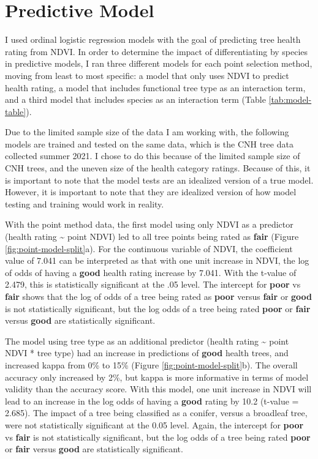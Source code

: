 \documentclass[12pt,twoside]{reedthesis}
\begin{document}
\hypertarget{predictive-model}{%
\section{Predictive Model}\label{predictive-model}}

I used ordinal logistic regression models with the goal of predicting
tree health rating from NDVI. In order to determine the impact of
differentiating by species in predictive models, I ran three different
models for each point selection method, moving from least to most
specific: a model that only uses NDVI to predict health rating, a model
that includes functional tree type as an interaction term, and a third
model that includes species as an interaction term (Table
\ref{tab:model-table}).

Due to the limited sample size of the data I am working with, the
following models are trained and tested on the same data, which is the
CNH tree data collected summer 2021. I chose to do this because of the
limited sample size of CNH trees, and the uneven size of the health
category ratings. Because of this, it is important to note that the
model tests are an idealized version of a true model. However, it is
important to note that they are idealized version of how model testing
and training would work in reality.

With the point method data, the first model using only NDVI as a
predictor (health rating \textasciitilde{} point NDVI) led to all tree points being
rated as \textbf{fair} (Figure \ref{fig:point-model-split}a). For the
continuous variable of NDVI, the coefficient value of 7.041 can be
interpreted as that with one unit increase in NDVI, the log of odds of
having a \textbf{good} health rating increase by 7.041. With the t-value of
2.479, this is statistically significant at the .05 level. The intercept
for \textbf{poor} vs \textbf{fair} shows that the log of odds of a tree being
rated as \textbf{poor} versus \textbf{fair} or \textbf{good} is not statistically
significant, but the log odds of a tree being rated \textbf{poor} or \textbf{fair}
versus \textbf{good} are statistically significant.

The model using tree type as an additional predictor (health rating \textasciitilde{}
point NDVI * tree type) had an increase in predictions of \textbf{good}
health trees, and increased kappa from 0\% to 15\% (Figure
\ref{fig:point-model-split}b). The overall accuracy only increased by
2\%, but kappa is more informative in terms of model validity than the
accuracy score. With this model, one unit increase in NDVI will lead to
an increase in the log odds of having a \textbf{good} rating by 10.2 (t-value
= 2.685). The impact of a tree being classified as a conifer, versus a
broadleaf tree, were not statistically significant at the 0.05 level.
Again, the intercept for \textbf{poor} vs \textbf{fair} is not statistically
significant, but the log odds of a tree being rated \textbf{poor} or \textbf{fair}
versus \textbf{good} are statistically significant.
\end{document}
